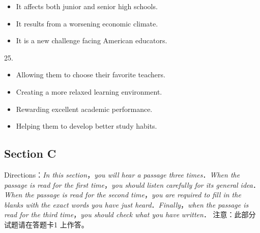 \documentclass[UTF8,11pt]{ctexart}
\begin{document}
\begin{itemize}[leftmargin=2em,itemsep=.2em,topsep=.4em]\item[B.] It affects both junior and senior high schools.
\item[C.] It results from a worsening economic climate.
\item[D.] It is a new challenge facing American educators.
\end{itemize}

25.


\begin{itemize}[leftmargin=2em,itemsep=.2em,topsep=.4em]\item[A.] Allowing them to choose their favorite teachers.
\end{itemize}

\begin{itemize}[leftmargin=2em,itemsep=.2em,topsep=.4em]\item[B.] Creating a more relaxed learning environment.
\item[C.] Rewarding excellent academic performance.
\item[D.] Helping them to develop better study habits.
\end{itemize}

\subsection*{\textbf{Section C}}


Directions：\textit{In this section}，\textit{you will hear a passage three times}．\textit{When the passage is read for the first time}，\textit{you should} \textit{listen carefully for its general idea}．\textit{When the passage is read for the second time}，\textit{you are required to fill in the blanks with} \textit{the exact words you have just heard}．\textit{Finally}，\textit{when the passage is read for the third time}，\textit{you should check what you have} \textit{written}． 注意：此部分试题请在答题卡1 上作答。
\end{document}
